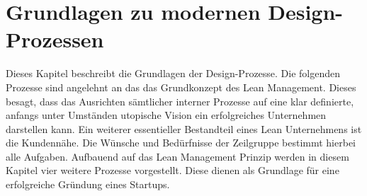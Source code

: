 \chapter{Grundlagen zu modernen Design-Prozessen}
\label{sec:Grundlagen}
Dieses Kapitel beschreibt die Grundlagen der Design-Prozesse. Die folgenden Prozesse sind angelehnt an das das Grundkonzept des Lean Management. Dieses besagt, dass das Ausrichten sämtlicher interner Prozesse auf eine klar definierte, anfangs unter Umständen utopische Vision ein erfolgreiches Unternehmen darstellen kann. Ein weiterer essentieller Bestandteil eines Lean Unternehmens ist die Kundennähe. Die Wünsche und Bedürfnisse der Zeilgruppe bestimmt hierbei alle Aufgaben.\cite{LeanManagement} Aufbauend auf das Lean Management Prinzip werden in diesem Kapitel vier weitere Prozesse vorgestellt. Diese dienen als Grundlage für eine erfolgreiche Gründung eines Startups.





